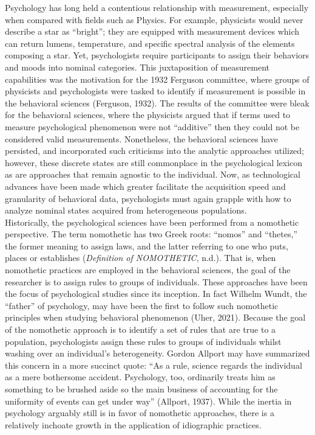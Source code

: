 \documentclass[12pt]{./styles/outhesis}
\begin{document}
Psychology has long held a contentious relationship with measurement,
especially when compared with fields such as Physics. For example,
physicists would never describe a star as ``bright''; they are equipped
with measurement devices which can return lumens, temperature, and
specific spectral analysis of the elements composing a star. Yet,
psychologists require participants to assign their behaviors and moods
into nominal categories. This juxtaposition of measurement capabilities
was the motivation for the 1932 Ferguson committee, where groups of
physicists and psychologists were tasked to identify if measurement is
possible in the behavioral sciences (Ferguson, 1932). The results of the
committee were bleak for the behavioral sciences, where the physicists
argued that if terms used to measure psychological phenomenon were not
``additive'' then they could not be considered valid measurements.
Nonetheless, the behavioral sciences have persisted, and incorporated
such criticisms into the analytic approaches utilized; however, these
discrete states are still commonplace in the psychological lexicon as are
approaches that remain agnostic to the individual. Now, as technological
advances have been made which greater facilitate the acquisition speed and
granularity of behavioral data, psychologists must again grapple with
how to analyze nominal states acquired from heterogeneous populations.\\

Historically, the psychological sciences have been performed from a
nomothetic perspective. The term nomothetic has two Greek roots:
``nomos'' and ``thetes,'' the former meaning to assign laws, and the
latter referring to one who puts, places or establishes
(\emph{Definition of {NOMOTHETIC}}, n.d.). That is, when nomothetic
practices are employed in the behavioral sciences, the goal of the
researcher is to assign rules to groups of individuals. These approaches
have been the focus of psychological studies since its inception. In
fact Wilhelm Wundt, the ``father'' of psychology, may have been the
first to follow such nomothetic principles when studying behavioral
phenomenon (Uher, 2021). Because the goal of the nomothetic approach is
to identify a set of rules that are true to a population, psychologists
assign these rules to groups of individuals whilst washing over
an individual's heterogeneity. Gordon Allport may have summarized this
concern in a more succinct quote: ``As a rule, science regards the
individual as a mere bothersome accident. Psychology, too, ordinarily
treats him as something to be brushed aside so the main business of
accounting for the uniformity of events can get under way'' (Allport,
1937). While the inertia in psychology arguably still is in favor of
nomothetic approaches, there is a relatively inchoate growth in the
application of idiographic practices.
\end{document}

